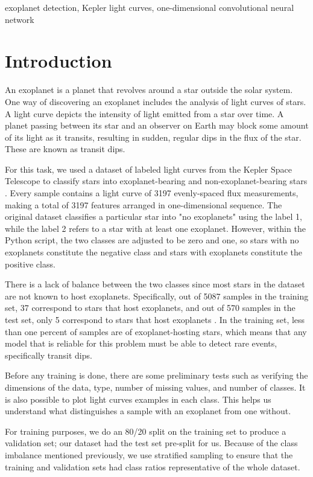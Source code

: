 \documentclass[conference]{IEEEtran}
\begin{document}
\begin{IEEEkeywords}
exoplanet detection, Kepler light curves, one-dimensional convolutional neural network
\end{IEEEkeywords}

\section{Introduction}
An exoplanet is a planet that revolves around a star outside the solar system. One way of discovering an exoplanet includes the analysis of light curves of stars. A light curve depicts the intensity of light emitted from a star over time. A planet passing between its star and an observer on Earth may block some amount of its light as it transits, resulting in sudden, regular dips in the flux of the star. These are known as transit dips.

For this task, we used a dataset of labeled light curves from the Kepler Space Telescope to classify stars into exoplanet-bearing and non-exoplanet-bearing stars \cite{kepler_dataset}. Every sample contains a light curve of 3197 evenly-spaced flux measurements, making a total of 3197 features arranged in one-dimensional sequence. The original dataset classifies a particular star into "no exoplanets" using the label 1, while the label 2 refers to a star with at least one exoplanet. However, within the Python script, the two classes are adjusted to be zero and one, so stars with no exoplanets constitute the negative class and stars with exoplanets constitute the positive class.

There is a lack of balance between the two classes since most stars in the dataset are not known to host exoplanets. Specifically, out of 5087 samples in the training set, 37 correspond to stars that host exoplanets, and out of 570 samples in the test set, only 5 correspond to stars that host exoplanets \cite{kepler_dataset}. In the training set, less than one percent of samples are of exoplanet-hosting stars, which means that any model that is reliable for this problem must be able to detect rare events, specifically transit dips.

Before any training is done, there are some preliminary tests such as verifying the dimensions of the data, type, number of missing values, and number of classes. It is also possible to plot light curves examples in each class. This helps us understand what distinguishes a sample with an exoplanet from one without.

For training purposes, we do an 80/20 split on the training set to produce a validation set; our dataset had the test set pre-split for us. Because of the class imbalance mentioned previously, we use stratified sampling to ensure that the training and validation sets had class ratios representative of the whole dataset.
\end{document}
